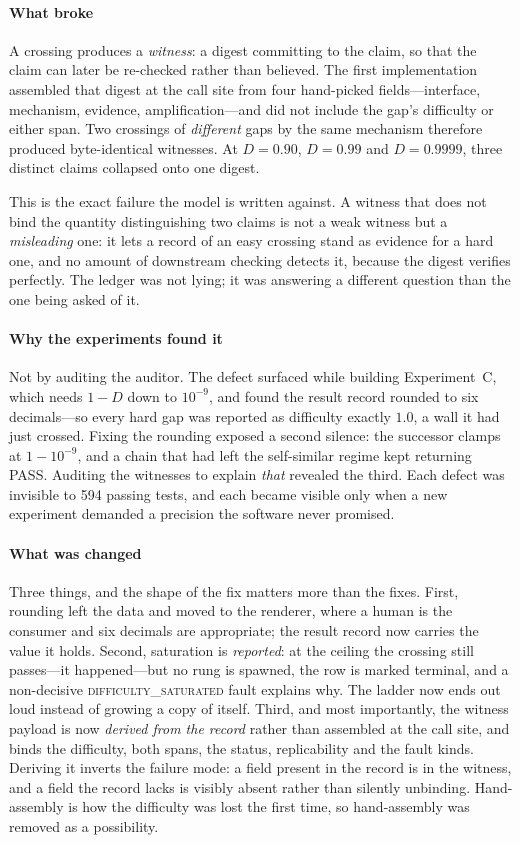 \documentclass[conference]{IEEEtran}
\theoremstyle{definition}
\begin{document}
\paragraph{What broke} A crossing produces a \emph{witness}: a digest committing
to the claim, so that the claim can later be re-checked rather than believed. The
first implementation assembled that digest at the call site from four hand-picked
fields---interface, mechanism, evidence, amplification---and did not include the
gap's difficulty or either span. Two crossings of \emph{different} gaps by the
same mechanism therefore produced byte-identical witnesses. At $D=0.90$,
$D=0.99$ and $D=0.9999$, three distinct claims collapsed onto one digest.

This is the exact failure the model is written against. A witness that does not
bind the quantity distinguishing two claims is not a weak witness but a
\emph{misleading} one: it lets a record of an easy crossing stand as evidence for a
hard one, and no amount of downstream checking detects it, because the digest
verifies perfectly. The ledger was not lying; it was answering a different question
than the one being asked of it.

\paragraph{Why the experiments found it} Not by auditing the auditor. The defect
surfaced while building Experiment~C, which needs $1-D$ down to $10^{-9}$, and found
the result record rounded to six decimals---so every hard gap was reported as
difficulty exactly $1.0$, a wall it had just crossed. Fixing the rounding exposed a
second silence: the successor clamps at $1-10^{-9}$, and a chain that had left the
self-similar regime kept returning PASS. Auditing the witnesses to explain \emph{that}
revealed the third. Each defect was invisible to 594 passing tests, and each became
visible only when a new experiment demanded a precision the software never promised.

\paragraph{What was changed} Three things, and the shape of the fix matters more
than the fixes. First, rounding left the data and moved to the renderer, where a
human is the consumer and six decimals are appropriate; the result record now
carries the value it holds. Second, saturation is \emph{reported}: at the ceiling
the crossing still passes---it happened---but no rung is spawned, the row is marked
terminal, and a non-decisive \textsc{difficulty\_saturated} fault explains why. The
ladder now ends out loud instead of growing a copy of itself. Third, and most
importantly, the witness payload is now \emph{derived from the record} rather than
assembled at the call site, and binds the difficulty, both spans, the status,
replicability and the fault kinds. Deriving it inverts the failure mode: a field
present in the record is in the witness, and a field the record lacks is visibly
absent rather than silently unbinding. Hand-assembly is how the difficulty was lost
the first time, so hand-assembly was removed as a possibility.
\end{document}
